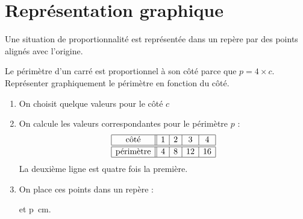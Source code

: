 


\section{Représentation graphique}

\begin{propriete}
    Une situation de proportionnalité est représentée dans un repère par des points alignés avec l'origine.
\end{propriete}

\begin{example}
    Le périmètre d'un carré est proportionnel à son côté parce que \( p=4\times c\). Représenter graphiquement le périmètre en fonction du côté.

    \begin{enumerate}
        \item
            On choisit quelque valeurs pour le côté \( c\)
        \item
            On calcule les valeurs correspondantes pour le périmètre \( p\) :
            \begin{equation*}
                \begin{array}[]{|c||c|c|c|c|}
                    \hline
                    \text{côté}&1&2&3&4\\
                    \hline\hline
                    \text{périmètre}&4&8&12&16\\
                    \hline
                \end{array}
            \end{equation*}
            La deuxième ligne est quatre fois la première.
        \item
            On place ces points dans un repère :
            \begin{center}

            \end{center}
            et \SI{p}{\centi\meter}.
    \end{enumerate}

\end{example}


